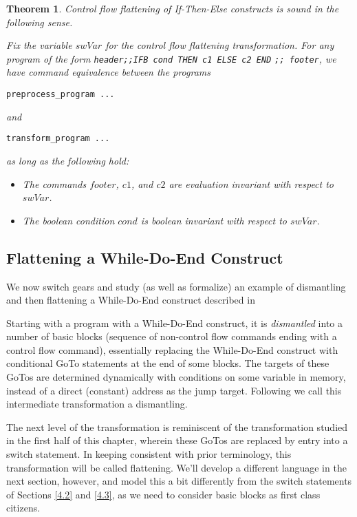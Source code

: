 \documentclass[compsoc,conference,a4paper,10pt,times]{IEEEtran}
\newtheorem{theorem}{Theorem}[section]
\begin{document}
\begin{theorem}\label{maintheo}
Control flow flattening of If-Then-Else constructs is sound in the following sense.  
\par Fix the variable $swVar$ for the control flow flattening transformation.  
For any program of the form \verb$header;;IFB cond THEN c1 ELSE c2 END$ \verb$;; footer$, we have command equivalence between the programs
\begin{verbatim}preprocess_program ...\end{verbatim}
and
\begin{verbatim}transform_program ...\end{verbatim}
as long as the following hold:
\begin{itemize}
    \item The commands $footer$, $c1$, and $c2$ are evaluation invariant with respect to $swVar$.
    \item The boolean condition $cond$ is boolean invariant with respect to $swVar$.
\end{itemize}
\end{theorem}

\subsection{Flattening a While-Do-End Construct}\label{4.4}
We now switch gears and study (as well as formalize) an example of dismantling and then flattening a While-Do-End construct described in \cite{Wang}

Starting with a program with a While-Do-End construct, it is \emph{dismantled} into a number of basic blocks (sequence of non-control flow commands ending with a control flow command), essentially replacing the While-Do-End construct with conditional GoTo statements at the end of some blocks.  The targets of these GoTos are determined dynamically with conditions on some variable in memory, instead of a direct (constant) address as the jump target. Following \cite{Wang} we call this intermediate transformation a dismantling.
\par The next level of the transformation is reminiscent of the transformation studied in the first half of this chapter, wherein these GoTos are replaced by entry into a switch statement.  In keeping consistent with prior terminology, this transformation will be called flattening.  We'll develop a different language in the next section, however, and model this a bit differently from the switch statements of Sections \ref{4.2} and \ref{4.3}, as we need to consider basic blocks as first class citizens.
\end{document}
